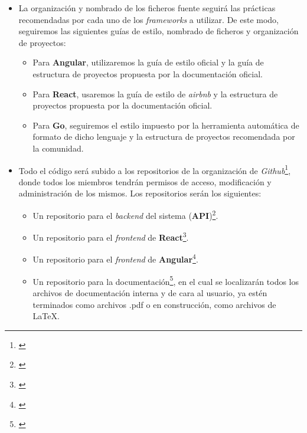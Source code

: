 \documentclass[11pt, a4paper, titlepage]{article}
\begin{document}
\begin{itemize}
    \item La organización y nombrado de los ficheros fuente seguirá las prácticas recomendadas por cada uno de los \textit{frameworks} a utilizar. De este modo, seguiremos las siguientes guías de estilo, nombrado de ficheros y organización de proyectos:
    \begin{itemize}
        \item Para \textbf{Angular}, utilizaremos la guía de estilo oficial\cite{estiloangular} y la guía de estructura de proyectos propuesta por la documentación oficial\cite{estructuraangular}.

        \item Para \textbf{React}, usaremos la
        guía de estilo de \textit{airbnb}\cite{estiloreact} y la estructura de proyectos propuesta por la documentación oficial\cite{estructurareact}.

        \item Para \textbf{Go}, seguiremos el estilo impuesto por la herramienta automática de formato de dicho lenguaje\cite{estilogolang} y la estructura de proyectos recomendada por la comunidad\cite{estructuragolang}.
    \end{itemize}

    \item Todo el código será subido a los repositorios de la organización de \textit{Github}\footnote{\href{https://github.com/UNIZAR-30226-2022-01}{}}, donde todos los miembros tendrán permisos de acceso, modificación y administración de los mismos. Los repositorios serán los siguientes:
    \begin{itemize}
        \item Un repositorio para el \textit{backend} del sistema (\textbf{API})\footnote{\href{https://github.com/UNIZAR-30226-2022-01/proyecto_software_backend}{}}.

        \item Un repositorio para el \textit{frontend} de \textbf{React}\footnote{\href{https://github.com/UNIZAR-30226-2022-01/proyecto_software_frontend_react}{}}.

        \item Un repositorio para el \textit{frontend} de \textbf{Angular}\footnote{\href{https://github.com/UNIZAR-30226-2022-01/proyecto_software_frontend_angular}{}}.

        \item Un repositorio para la documentación\footnote{\href{https://github.com/UNIZAR-30226-2022-01/proyecto_software_documentacion}{\color{blue}{Repositorio de documentación}}}, en el cual se localizarán todos los archivos de documentación interna y de cara al usuario, ya estén terminados como archivos .pdf o en construcción, como archivos de \LaTeX.
    \end{itemize}


\end{itemize}
\end{document}
